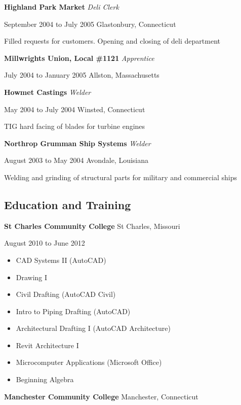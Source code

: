 \documentclass[9pt]{extarticle}
\begin{document}
\hfill

\textbf{Highland Park Market} \hfill \textit{Deli Clerk}

September 2004 to July 2005 \hfill Glastonbury, Connecticut

\hfill

Filled requests for customers. Opening and closing of deli department

\hfill

\textbf{Millwrights Union, Local \#1121} \hfill \textit{Apprentice} 

July 2004 to January 2005 \hfill Allston, Massachusetts

\hfill

\textbf{Howmet Castings} \hfill \textit{Welder}

May 2004 to July 2004 \hfill Winsted, Connecticut

\hfill

TIG hard facing of blades for turbine engines

\hfill

\textbf{Northrop Grumman Ship Systems} \hfill \textit{Welder}

August 2003 to May 2004 \hfill Avondale, Louisiana

\hfill

Welding and grinding of structural parts for military and commercial ships


\subsection*{Education and Training}
\textbf{St Charles Community College} \hfill St Charles, Missouri

August 2010 to June 2012
\begin{itemize}
    \item CAD Systems II (AutoCAD) 
    \item Drawing I 
    \item Civil Drafting (AutoCAD Civil)
    \item Intro to Piping Drafting (AutoCAD) 
    \item Architectural Drafting I (AutoCAD Architecture)
    \item Revit Architecture I 
    \item Microcomputer Applications (Microsoft Office)
    \item Beginning Algebra
\end{itemize}

\hfill

\textbf{Manchester Community College} \hfill Manchester, Connecticut
\end{document}
